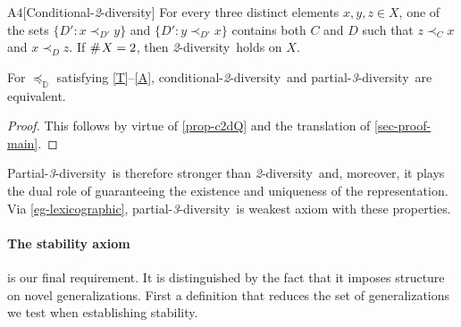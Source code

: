 \documentclass[12pt,a4paper,twoside]{article}
\newcommand{\countof}{\mathbin{\#}\hskip1pt}
\newcommand{\mbbd}{{\mathds D}}
\newcommand{\parthreediv}{\textup{partial-\textit{3}-diversity}}
\newcommand{\Parthreediv}{\textup{Partial-\textit{3}-diversity}}
\newcommand{\condtwodiv}{\textup{conditional-\textit{2}-diversity}}
\newcommand{\twodiv}{\textit{2}-\textup{diversity}}
\begin{document}
\begin{taggedblank}{\textup{A}$4$}[Conditional-\twodiv]\label{c2d}
  For every three distinct elements $x , y , z \in X$, one of the sets
  $\{ D' : x \prec _{D ' } y \}$ and $\{ D' : y \prec_{D ' } x \}$ contains 
  both $C$ and $D$ such that $z \prec _{ C } x$ and
  $x \prec _{ D } z$. If $\countof X = 2$, then \twodiv\ holds on $X$.

\end{taggedblank}


\begin{observation}\label{obs-c2d}
  For $\preceq_{\mbbd}$ satisfying \ref{T}--\ref{A}, \condtwodiv\ and
  \parthreediv\ are equivalent.
\end{observation}
\begin{proof}\label{proof-obs-c2d}
  This follows by virtue of \cref{prop-c2dQ} and the translation of
  \cref{sec-proof-main}.
\end{proof}
\Parthreediv\ is therefore stronger than \twodiv\ and, moreover, it plays the
dual role of guaranteeing the existence and uniqueness of the representation.
Via \cref{eg-lexicographic}, \parthreediv\ is weakest axiom with these
properties.
\paragraph{The {stability} axiom \hskip-10pt} is our final requirement. It is
distinguished by the fact that it imposes structure on novel {generalization}s.  First
a definition that reduces the set of {generalization}s we test when establishing
{stability}.
\end{document}
